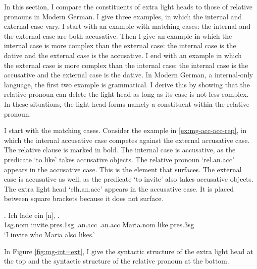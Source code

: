In this section, I compare the constituents of extra light heads to those of relative pronouns in Modern German. I give three examples, in which the internal and external case vary.
I start with an example with matching cases: the internal and the external case are both accusative.
Then I give an example in which the internal case is more complex than the external case: the internal case is the dative and the external case is the accusative.
I end with an example in which the external case is more complex than the internal case: the internal case is the accusative and the external case is the dative.
In Modern German, a internal-only language, the first two example is grammatical. I derive this by showing that the relative pronoun can delete the light head as long as its case is not less complex. In these situations, the light head forms namely a constituent within the relative pronoun.

I start with the matching cases.
Consider the example in \ref{ex:mg-acc-acc-rep}, in which the internal accusative case competes against the external accusative case. The relative clause is marked in bold.
The internal case is accusative, as the predicate  `to like' takes accusative objects. The relative pronoun  `\ac{rel}.\ac{an}.\ac{acc}' appears in the accusative case. This is the element that surfaces.
The external case is accusative as well, as the predicate  `to invite' also takes accusative objects. The extra light head  `\ac{elh}.\ac{an}.\ac{acc}' appears in the accusative case. It is placed between square brackets because it does not surface.

\exg. Ich {lade ein} [n],    .\\
 1\ac{sg}.\ac{nom} invite.\ac{pres}.1\ac{sg}\scsub{[acc]} .\ac{an}.\ac{acc} .\ac{an}.\ac{acc} Maria.\ac{nom} like.\ac{pres}.3\ac{sg}\scsub{[acc]}\\
 `I invite who Maria also likes.' \label{ex:mg-acc-acc-rep}

In Figure \ref{fig:mg-int=ext}, I give the syntactic structure of the extra light head at the top and the syntactic structure of the relative pronoun at the bottom.

